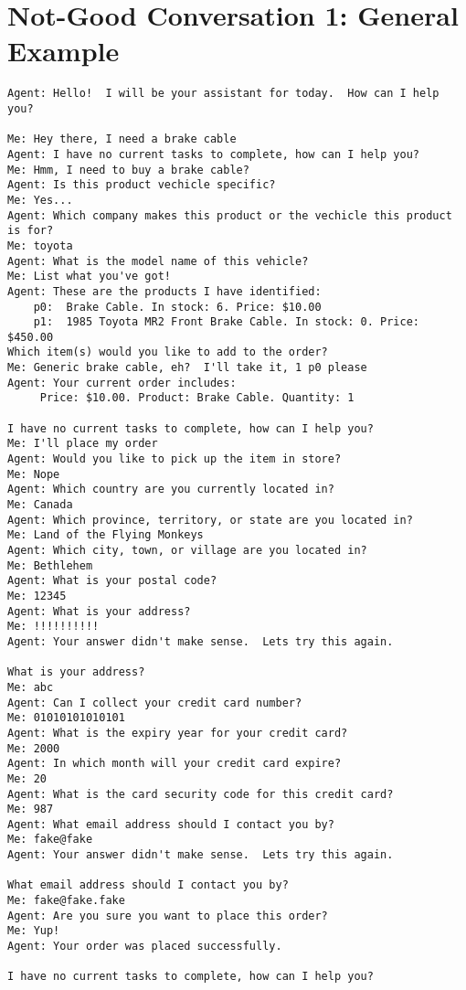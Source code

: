 \documentclass[11pt, titlepage]{article}
\author{Graeme Douglas (76316090)}
\begin{document}
\section{Not-Good Conversation 1: General Example}

\begin{lstlisting}
Agent: Hello!  I will be your assistant for today.  How can I help you?

Me: Hey there, I need a brake cable
Agent: I have no current tasks to complete, how can I help you?
Me: Hmm, I need to buy a brake cable?
Agent: Is this product vechicle specific?
Me: Yes...
Agent: Which company makes this product or the vechicle this product is for?
Me: toyota
Agent: What is the model name of this vehicle?
Me: List what you've got!
Agent: These are the products I have identified:
	p0:	 Brake Cable. In stock: 6. Price: $10.00
	p1:	 1985 Toyota MR2 Front Brake Cable. In stock: 0. Price: $450.00
Which item(s) would you like to add to the order?
Me: Generic brake cable, eh?  I'll take it, 1 p0 please
Agent: Your current order includes:
	 Price: $10.00. Product: Brake Cable. Quantity: 1

I have no current tasks to complete, how can I help you?
Me: I'll place my order
Agent: Would you like to pick up the item in store?
Me: Nope
Agent: Which country are you currently located in?
Me: Canada
Agent: Which province, territory, or state are you located in?
Me: Land of the Flying Monkeys
Agent: Which city, town, or village are you located in?
Me: Bethlehem
Agent: What is your postal code?
Me: 12345
Agent: What is your address?
Me: !!!!!!!!!!
Agent: Your answer didn't make sense.  Lets try this again.

What is your address?
Me: abc
Agent: Can I collect your credit card number?
Me: 01010101010101
Agent: What is the expiry year for your credit card?
Me: 2000
Agent: In which month will your credit card expire?
Me: 20
Agent: What is the card security code for this credit card?
Me: 987
Agent: What email address should I contact you by?
Me: fake@fake
Agent: Your answer didn't make sense.  Lets try this again.

What email address should I contact you by?
Me: fake@fake.fake
Agent: Are you sure you want to place this order?
Me: Yup!
Agent: Your order was placed successfully.

I have no current tasks to complete, how can I help you?
\end{lstlisting}
\end{document}
